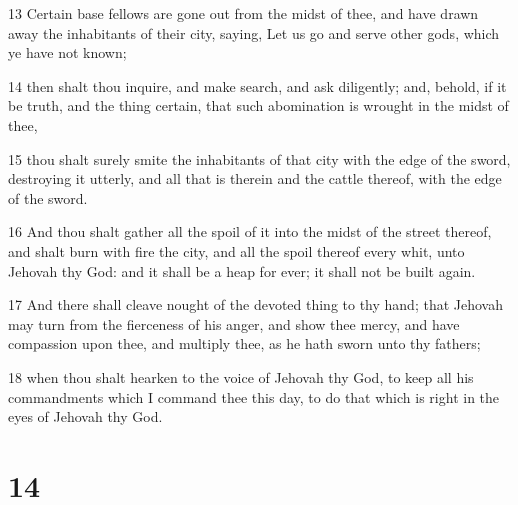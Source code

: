 \par 13 Certain base fellows are gone out from the midst of thee, and have drawn away the inhabitants of their city, saying, Let us go and serve other gods, which ye have not known;
\par 14 then shalt thou inquire, and make search, and ask diligently; and, behold, if it be truth, and the thing certain, that such abomination is wrought in the midst of thee,
\par 15 thou shalt surely smite the inhabitants of that city with the edge of the sword, destroying it utterly, and all that is therein and the cattle thereof, with the edge of the sword.
\par 16 And thou shalt gather all the spoil of it into the midst of the street thereof, and shalt burn with fire the city, and all the spoil thereof every whit, unto Jehovah thy God: and it shall be a heap for ever; it shall not be built again.
\par 17 And there shall cleave nought of the devoted thing to thy hand; that Jehovah may turn from the fierceness of his anger, and show thee mercy, and have compassion upon thee, and multiply thee, as he hath sworn unto thy fathers;
\par 18 when thou shalt hearken to the voice of Jehovah thy God, to keep all his commandments which I command thee this day, to do that which is right in the eyes of Jehovah thy God.

\chapter{14}

